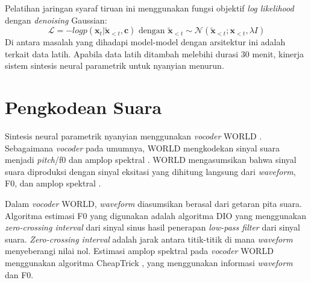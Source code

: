 Pelatihan jaringan syaraf tiruan ini menggunakan fungsi objektif \textit{log likelihood} dengan \textit{denoising} Gaussian:\parencite{bonada2017singing}
\begin{equation}
    \mathcal{L} = -log p(\mathbf{x}_t|\mathbf{\tilde{x}}_{<t},\mathbf{c}) \text{ dengan } \mathbf{\tilde{x}}_{<t} \sim \mathcal{N}(\mathbf{\tilde{x}}_{<t}; \mathbf{x}_{<t},\lambda I )
\end{equation}
Di antara masalah yang dihadapi model-model dengan arsitektur ini adalah terkait data latih. Apabila data latih ditambah melebihi durasi 30 menit, kinerja sistem sintesis neural parametrik untuk nyanyian menurun. \parencite{bonada2017singing}

\section{Pengkodean Suara} \label{voice coding}

Sintesis neural parametrik nyanyian \parencite{bonada2017singing} menggunakan \textit{vocoder} WORLD \parencite{morise2016world}. Sebagaimana \textit{vocoder} pada umumnya, WORLD mengkodekan sinyal suara menjadi \textit{pitch}/f0 dan amplop spektral \parencite{dudley1939vocoder}. WORLD mengasumsikan bahwa sinyal suara diproduksi dengan sinyal eksitasi yang dihitung langsung dari \textit{waveform}, F0, dan amplop spektral \parencite{morise2016world}.

Dalam \textit{vocoder} WORLD, \textit{waveform} diasumsikan berasal dari getaran pita suara. Algoritma estimasi F0 yang digunakan adalah algoritma DIO \parencite{morise2009fast} yang menggunakan \textit{zero-crossing interval} dari sinyal sinus hasil penerapan \textit{low-pass filter} dari sinyal suara. \textit{Zero-crossing interval} adalah jarak antara titik-titik di mana \textit{waveform} menyeberangi nilai nol. Estimasi amplop spektral pada \textit{vocoder} WORLD menggunakan algoritma CheapTrick \parencite{morise2015cheaptrick}, yang menggunakan informasi \textit{waveform} dan F0.

